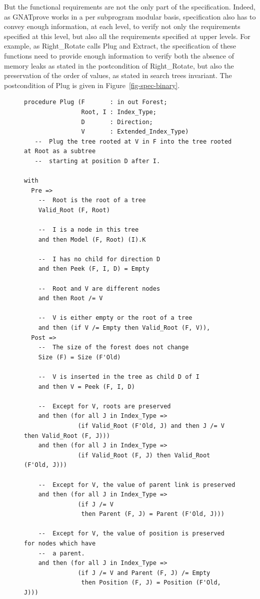 \documentclass[11pt,a4paper]{article}
\begin{document}
But the functional requirements are not the only part of the specification. Indeed, as GNATprove works in a per
subprogram modular basis, specification also has to convey enough information, at each level, to verify not only the
requirements specified at this level, but also all the requirements specified at upper levels. For example, as
Right\_Rotate calls Plug and Extract, the specification of these functions need to provide enough information to
verify both the absence of memory leaks as stated in the postcondition of Right\_Rotate, but also the preservation of
the order of values, as stated in search trees invariant. The postcondition of Plug is given in 
Figure~\ref{fig-spec-binary}.

\begin{figure}
\begin{small}
\begin{lstlisting}
procedure Plug (F       : in out Forest;
                Root, I : Index_Type;
                D       : Direction;
                V       : Extended_Index_Type)
   --  Plug the tree rooted at V in F into the tree rooted at Root as a subtree
   --  starting at position D after I.

with
  Pre =>
    --  Root is the root of a tree
    Valid_Root (F, Root)

    --  I is a node in this tree
    and then Model (F, Root) (I).K

    --  I has no child for direction D
    and then Peek (F, I, D) = Empty

    --  Root and V are different nodes
    and then Root /= V

    --  V is either empty or the root of a tree
    and then (if V /= Empty then Valid_Root (F, V)),
  Post =>
    --  The size of the forest does not change
    Size (F) = Size (F'Old)

    --  V is inserted in the tree as child D of I
    and then V = Peek (F, I, D)

    --  Except for V, roots are preserved
    and then (for all J in Index_Type =>
               (if Valid_Root (F'Old, J) and then J /= V then Valid_Root (F, J)))
    and then (for all J in Index_Type =>
               (if Valid_Root (F, J) then Valid_Root (F'Old, J)))

    --  Except for V, the value of parent link is preserved
    and then (for all J in Index_Type =>
               (if J /= V
                then Parent (F, J) = Parent (F'Old, J)))

    --  Except for V, the value of position is preserved for nodes which have
    --  a parent.
    and then (for all J in Index_Type =>
               (if J /= V and Parent (F, J) /= Empty
                then Position (F, J) = Position (F'Old, J)))


\end{lstlisting}
\end{small}
\end{figure}
\end{document}

